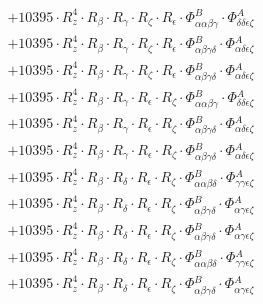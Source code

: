 \documentclass{article}
\begin{document}
\begin{subequations}
\begin{gather}
\begin{array}{c}
 \\[0.2em] 		 + 10395 \cdot R_{z}^{4} \cdot R_{\beta{}} \cdot R_{\gamma{}} \cdot R_{\zeta{}} \cdot R_{\epsilon{}} \cdot \Phi{}^{B}_{\alpha{}\alpha{}\beta{}\gamma{}} \cdot \Phi{}^{A}_{\delta{}\delta{}\epsilon{}\zeta{}} 
 \\[0.2em] 		 + 10395 \cdot R_{z}^{4} \cdot R_{\beta{}} \cdot R_{\gamma{}} \cdot R_{\zeta{}} \cdot R_{\epsilon{}} \cdot \Phi{}^{B}_{\alpha{}\beta{}\gamma{}\delta{}} \cdot \Phi{}^{A}_{\alpha{}\delta{}\epsilon{}\zeta{}} 
 \\[0.2em] 		 + 10395 \cdot R_{z}^{4} \cdot R_{\beta{}} \cdot R_{\gamma{}} \cdot R_{\zeta{}} \cdot R_{\epsilon{}} \cdot \Phi{}^{B}_{\alpha{}\beta{}\gamma{}\delta{}} \cdot \Phi{}^{A}_{\alpha{}\delta{}\epsilon{}\zeta{}} 
 \\[0.2em] 		 + 10395 \cdot R_{z}^{4} \cdot R_{\beta{}} \cdot R_{\gamma{}} \cdot R_{\epsilon{}} \cdot R_{\zeta{}} \cdot \Phi{}^{B}_{\alpha{}\alpha{}\beta{}\gamma{}} \cdot \Phi{}^{A}_{\delta{}\delta{}\epsilon{}\zeta{}} 
 \\[0.2em] 		 + 10395 \cdot R_{z}^{4} \cdot R_{\beta{}} \cdot R_{\gamma{}} \cdot R_{\epsilon{}} \cdot R_{\zeta{}} \cdot \Phi{}^{B}_{\alpha{}\beta{}\gamma{}\delta{}} \cdot \Phi{}^{A}_{\alpha{}\delta{}\epsilon{}\zeta{}} 
 \\[0.2em] 		 + 10395 \cdot R_{z}^{4} \cdot R_{\beta{}} \cdot R_{\gamma{}} \cdot R_{\epsilon{}} \cdot R_{\zeta{}} \cdot \Phi{}^{B}_{\alpha{}\beta{}\gamma{}\delta{}} \cdot \Phi{}^{A}_{\alpha{}\delta{}\epsilon{}\zeta{}} 
 \\[0.2em] 		 + 10395 \cdot R_{z}^{4} \cdot R_{\beta{}} \cdot R_{\delta{}} \cdot R_{\epsilon{}} \cdot R_{\zeta{}} \cdot \Phi{}^{B}_{\alpha{}\alpha{}\beta{}\delta{}} \cdot \Phi{}^{A}_{\gamma{}\gamma{}\epsilon{}\zeta{}} 
 \\[0.2em] 		 + 10395 \cdot R_{z}^{4} \cdot R_{\beta{}} \cdot R_{\delta{}} \cdot R_{\epsilon{}} \cdot R_{\zeta{}} \cdot \Phi{}^{B}_{\alpha{}\beta{}\gamma{}\delta{}} \cdot \Phi{}^{A}_{\alpha{}\gamma{}\epsilon{}\zeta{}} 
 \\[0.2em] 		 + 10395 \cdot R_{z}^{4} \cdot R_{\beta{}} \cdot R_{\delta{}} \cdot R_{\epsilon{}} \cdot R_{\zeta{}} \cdot \Phi{}^{B}_{\alpha{}\beta{}\gamma{}\delta{}} \cdot \Phi{}^{A}_{\alpha{}\gamma{}\epsilon{}\zeta{}} 
 \\[0.2em] 		 + 10395 \cdot R_{z}^{4} \cdot R_{\beta{}} \cdot R_{\delta{}} \cdot R_{\epsilon{}} \cdot R_{\zeta{}} \cdot \Phi{}^{B}_{\alpha{}\alpha{}\beta{}\delta{}} \cdot \Phi{}^{A}_{\gamma{}\gamma{}\epsilon{}\zeta{}} 
 \\[0.2em] 		 + 10395 \cdot R_{z}^{4} \cdot R_{\beta{}} \cdot R_{\delta{}} \cdot R_{\epsilon{}} \cdot R_{\zeta{}} \cdot \Phi{}^{B}_{\alpha{}\beta{}\gamma{}\delta{}} \cdot \Phi{}^{A}_{\alpha{}\gamma{}\epsilon{}\zeta{}} 

\end{array}
\end{gather}
\end{subequations}
\end{document}
